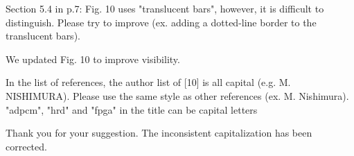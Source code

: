 \documentclass[a4j]{jsarticle}
\begin{document}
\vspace{0.3cm}
\begin{screen}
Section 5.4 in p.7: Fig. 10 uses "translucent bars", however, it is difficult to distinguish. Please try to improve (ex. adding a dotted-line border to the translucent bars).
\end{screen}
We updated Fig. 10 to improve visibility.

\vspace{0.3cm}
\begin{screen}
In the list of references, the author list of [10] is all capital (e.g. M. NISHIMURA). Please use the same style as other references (ex. M. Nishimura). "adpcm", "hrd" and
"fpga" in the title can be capital letters
\end{screen}
Thank you for your suggestion. The inconsistent capitalization has been corrected.
\end{document}
